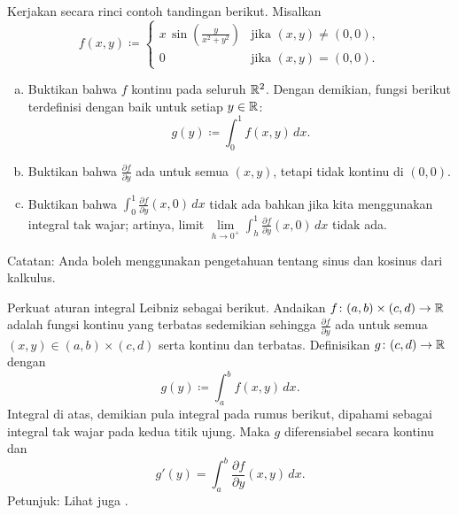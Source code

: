\begin{exercise}
\pagebreak[2]
Kerjakan secara rinci contoh tandingan berikut.  Misalkan
\begin{equation*}
f(x,y) \coloneqq
\begin{cases}
x \,\sin \left(\frac{y}{x^2+y^2}\right) & \text{jika } (x,y) \neq (0,0),\\
0                                       & \text{jika } (x,y)=(0,0).
\end{cases}
\end{equation*}
\begin{enumerate}[a)]
\item
Buktikan bahwa $f$ kontinu pada seluruh ${\mathbb{R}}^2$.
Dengan demikian, fungsi berikut terdefinisi dengan baik untuk setiap $y \in {\mathbb{R}}$:
\begin{equation*}
g(y) \coloneqq \int_0^1 f(x,y) \, dx .
\end{equation*}
\item
Buktikan bahwa $\frac{\partial f}{\partial y}$ ada untuk semua $(x,y)$,
tetapi tidak kontinu di $(0,0)$.
\item
Buktikan bahwa $\int_0^1 \frac{\partial f}{\partial y}(x,0) \, dx$ tidak
ada bahkan jika kita menggunakan integral tak wajar; artinya,
limit
$\lim\limits_{h \to 0^+} \int_h^1 \frac{\partial f}{\partial y}(x,0) \, dx$
tidak ada.
\end{enumerate}
Catatan: Anda boleh menggunakan pengetahuan tentang sinus dan kosinus dari kalkulus.
\end{exercise}

\begin{exercise} \label{exercise:strongerleibniz}
\pagebreak[3]
Perkuat aturan integral Leibniz sebagai berikut.
Andaikan $f \colon (a,b) \times (c,d) \to {\mathbb{R}}$ adalah fungsi kontinu yang terbatas
sedemikian sehingga $\frac{\partial f}{\partial y}$ ada untuk semua $(x,y) \in (a,b)
\times (c,d)$ serta kontinu dan terbatas.  Definisikan $g \colon (c,d) \to {\mathbb{R}}$
dengan
\begin{equation*}
g(y) \coloneqq \int_a^b f(x,y) \,dx .
\end{equation*}
Integral di atas, demikian pula integral pada rumus berikut, dipahami sebagai
integral tak wajar pada kedua titik ujung.
Maka $g$ diferensiabel secara kontinu dan
\begin{equation*}
g'(y) = \int_a^b \frac{\partial f}{\partial y}(x,y) \,dx .
\end{equation*}
Petunjuk: Lihat juga .
\end{exercise}

